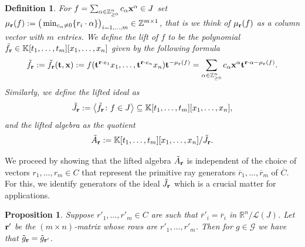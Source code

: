 \documentclass[pdftex]{sigma}%
\newtheorem{Proposition}[Theorem]{Proposition}
\newtheorem{Definition}[Theorem]{Definition}
\numberwithin{equation}{section}
\begin{document}
\begin{Definition}
For $f=\sum_{\alpha \in \mathbb Z^n_{\ge 0}} c_\alpha {\bf x}^{\alpha} \in J$ set ${\mu}_{\bf r}(f):=\big(\min_{c_\alpha\not =0}\{r_i\cdot \alpha\}\big)_{i=1,\dots,m}\in \mathbb Z^{m\times 1}$, that is we think of $\mu_{\bf r}(f)$ as a column vector with $m$ entries.
We define the {\it lift of $f$} to be the polynomial $ \tilde f_{\bf r} \in \mathbb K[t_1,\dots,t_m][x_1,\dots,x_n]$ given by the following formula
\begin{displaymath}
 \tilde f_{\bf r} := \tilde f_{\bf r} ({\bf t},{\bf x})
 := f({\bf t}^{{\bf r}\cdot e_1}x_1,\dots, {\bf t}^{{\bf r}\cdot e_n}x_n) {\bf t}^{-\mu_{\bf r}(f)}
 =\sum_{\alpha \in \mathbb Z^n_{\ge 0}} c_\alpha {\bf x}^{\alpha} {\bf t}^{{\bf r}\cdot \alpha -\mu_{\bf r}(f)}.
\end{displaymath}
Similarly, we define the {\it lifted ideal} as
\begin{displaymath} %
\tilde J_{\bf r}:=\big\langle \tilde f_{\bf r} \colon f \in J \big\rangle \subseteq \mathbb K[t_1,\dots,t_m][x_1,\dots,x_n],
\end{displaymath}
and the {\it lifted algebra} as the quotient
\begin{equation}\label{eq:lifted algebra}
\tilde A_{\bf r}:=\mathbb K[t_1,\dots,t_m][x_1,\dots,x_n]/\tilde J_{\bf r}.
\end{equation}
\end{Definition}
We proceed by showing that the lifted algebra $\tilde A_{\bf r}$ is independent of the choice of vectors $r_1, \dots , r_m \in C$ that represent the primitive ray generators $\overline{r}_1,\dots , \overline{r}_m$ of $\overline{C}$. For this, we identify generators of the ideal $\tilde J_{\bf r}$ which is a crucial matter for applications.

\begin{Proposition}
Suppose $r'_1, \dots , r'_m \in C$ are such that $\overline{r}'_i= \overline{r}_i$ in $ \mathbb R^n / \mathcal{L}(J)$.
Let ${\bf r'}$ be the $(m\times n)$-matrix whose rows are $r'_1,\dots, r'_m$. Then for $g\in \mathcal{G}$ we have that $\tilde{g}_{\bf r}=\tilde{g}_{\bf r'}$.
\end{Proposition}
\end{document}
